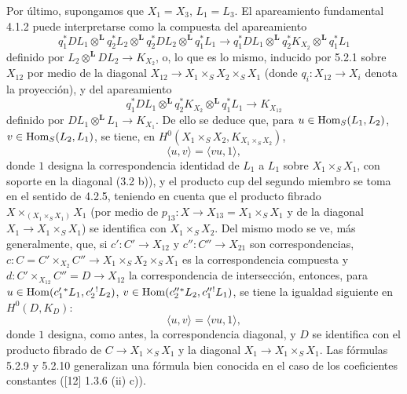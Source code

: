 Por último, supongamos que $X_1=X_3$, $L_1=L_3$. El apareamiento fundamental 4.1.2 puede interpretarse como la compuesta del apareamiento
\begin{equation}
\tag{5.2.7}
q_1^*DL_1\otimes^{\mathbf L}q_2^*L_2\otimes^{\mathbf L}q_2^*DL_2\otimes^{\mathbf L}q_1^*L_1
\longrightarrow
q_1^*DL_1\otimes^{\mathbf L}q_2^*K_{X_2}\otimes^{\mathbf L}q_1^*L_1
\end{equation}
definido por $L_2\otimes^{\mathbf L}DL_2\to K_{X_2}$, o, lo que es lo mismo, inducido por 5.2.1 sobre $X_{12}$ por medio de la diagonal $X_{12}\to X_1\times_SX_2\times_SX_1$ (donde $q_i:X_{12}\to X_i$ denota la proyección), y del apareamiento
\begin{equation}
\tag{5.2.8}
q_1^*DL_1\otimes^{\mathbf L}q_2^*K_{X_2}\otimes^{\mathbf L}q_1^*L_1\longrightarrow K_{X_{12}}
\end{equation}
definido por $DL_1\otimes^{\mathbf L}L_1\to K_{X_1}$. De ello se deduce que, para $u\in\operatorname{Hom}_S(L_1,L_2)$, $v\in\operatorname{Hom}_S(L_2,L_1)$, se tiene, en $H^0(X_1\times_SX_2,K_{X_1\times_SX_2})$,
\begin{equation}
\tag{5.2.9}
\langle u,v\rangle=\langle vu,1\rangle,
\end{equation}
donde $1$ designa la correspondencia identidad de $L_1$ a $L_1$ sobre $X_1\times_SX_1$, con soporte en la diagonal (3.2 b)), y el producto cup del segundo miembro se toma en el sentido de 4.2.5, teniendo en cuenta que el producto fibrado $X\times_{(X_1\times_SX_1)}X_1$ (por medio de $p_{13}:X\to X_{13}=X_1\times_SX_1$ y de la diagonal $X_1\to X_1\times_SX_1$) se identifica con $X_1\times_SX_2$. Del mismo modo se ve, más generalmente, que, si $c':C'\to X_{12}$ y $c'':C''\to X_{21}$ son correspondencias, $c:C=C'\times_{X_2}C''\to X_1\times_SX_2\times_SX_1$ es la correspondencia compuesta y $d:C'\times_{X_{12}}C''=D\to X_{12}$ la correspondencia de intersección, entonces, para $u\in\operatorname{Hom}(c_1'{}^*L_1,c_2'{}^!L_2)$, $v\in\operatorname{Hom}(c_2''{}^*L_2,c_1''{}^!L_1)$, se tiene la igualdad siguiente en $H^0(D,K_D)$:
\begin{equation}
\tag{5.2.10}
\langle u,v\rangle=\langle vu,1\rangle,
\end{equation}
donde $1$ designa, como antes, la correspondencia diagonal, y $D$ se identifica con el producto fibrado de $C\to X_1\times_SX_1$ y la diagonal $X_1\to X_1\times_SX_1$. Las fórmulas 5.2.9 y 5.2.10 generalizan una fórmula bien conocida en el caso de los coeficientes constantes ([12] 1.3.6 (ii) c)).
